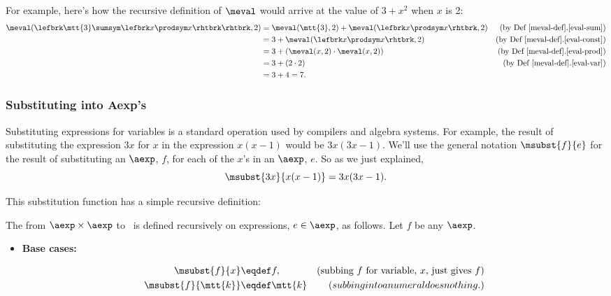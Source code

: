 \begin{definition}
\begin{definition}
\end{definition}

For example, here's how the recursive definition of $\meval$ would arrive at
the value of $3+x^2$ when $x$ is 2:
\begin{align*}
\meval(\lefbrk \mtt{3} \sumsym \lefbrk x \prodsym x\rhtbrk \rhtbrk,2)
 & = \meval(\mtt{3},2) + \meval(\lefbrk x \prodsym x \rhtbrk,2)
                  & \text{(by~Def~\ref{meval-def}.\ref{eval-sum})}\\
 & = 3 + \meval(\lefbrk x \prodsym x \rhtbrk,2) & \text{(by~Def~\ref{meval-def}.\ref{eval-const})}\\
 & = 3 + (\meval(x,2) \cdot \meval(x,2)) & \text{(by~Def~\ref{meval-def}.\ref{eval-prod})}\\
 & = 3 + (2 \cdot 2) & \text{(by~Def~\ref{meval-def}.\ref{eval-var})}\\
 & = 3 + 4 = 7.
\end{align*}

\subsubsection{Substituting into Aexp's}
Substituting expressions for variables is a standard operation used by
compilers and algebra systems.  For example, the result of substituting
the expression $3x$ for $x$ in the expression $x(x-1)$ would be
$3x(3x-1)$.  We'll use the general notation $\msubst{f}{e}$ for the result
of substituting an $\aexp$, $f$, for each of the $x$'s in an $\aexp$, $e$.
So as we just explained,
\[
\msubst{3x}{x(x-1)} = 3x(3x-1).
\]

This substitution function has a simple recursive definition:

\begin{definition}\label{subst-def}
  The  from $\aexp \times \aexp$ to \aexp\ is
  defined recursively on expressions, $e \in \aexp$, as follows.  Let $f$
  be any $\aexp$.

\begin{itemize}
\item \textbf{Base cases:}

\begin{align*}
\msubst{f}{x} & \eqdef f, \label{subst-var} 
    & \text{(subbing $f$ for variable, $x$, just gives $f$)}\\
\msubst{f}{\mtt{k}} & \eqdef \mtt{k}
    & (subbing into a numeral does nothing.)\label{subst-const}
\end{align*}



\end{itemize}
\end{definition}
\end{definition}
